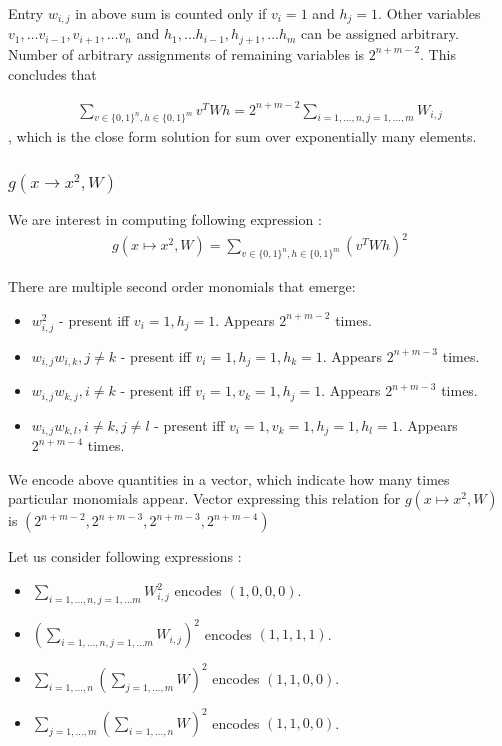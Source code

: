 \documentclass{article}
\begin{document}
Entry $w_{i,j}$ in above sum is counted only if $v_i = 1$ and $h_j = 1$. Other variables
$v_1, \dots v_{i-1}, v_{i+1}, \dots v_n$ and $h_1, \dots h_{i-1}, h_{j+1}, \dots h_m$ can be 
assigned arbitrary. Number of arbitrary assignments of remaining variables is $2^{n + m - 2}$. 
This concludes that 

\begin{gather*}
	\sum_{v \in \{0, 1\}^n, h \in \{0, 1\}^m} v^TWh = 2^{n + m - 2}\sum_{i = 1, \dots, n, j = 1, \dots, m} W_{i, j}
\end{gather*}
, which is the close form solution for sum over exponentially many elements.

\subsubsection{$g(x \rightarrow x^2, W)$}

We are interest in computing following expression : 
\begin{gather*}
	g(x \mapsto x^2, W) = \sum_{v \in \{0, 1\}^n, h \in \{0, 1\}^m} (v^TWh)^2
\end{gather*}

There are multiple second order monomials that emerge: 

\begin{itemize}
	\item $w_{i,j}^2$ - present iff $v_i = 1, h_j = 1$. Appears $2^{n + m - 2}$ times.
	\item $w_{i,j} w_{i, k}, j \neq k$ - present iff $v_i = 1, h_j = 1, h_k = 1$. Appears $2^{n + m - 3}$ times.	
	\item $w_{i,j} w_{k, j}, i \neq k$ - present iff $v_i = 1, v_k = 1, h_j = 1$. Appears $2^{n + m - 3}$ times.
	\item $w_{i,j} w_{k, l}, i \neq k, j \neq l$ - present iff $v_i = 1, v_k = 1, h_j = 1, h_l = 1$. Appears $2^{n + m - 4}$ times.			
\end{itemize}
We encode above quantities in a vector, which indicate how many times particular monomials 
appear. Vector expressing this relation for $g(x \mapsto x^2, W)$ is $(2^{n + m - 2}, 2^{n + m - 3}, 2^{n + m - 3}, 2^{n + m - 4})$


Let us consider following expressions : 
\begin{itemize}
 \item $\sum_{i = 1, \dots, n, j = 1, \dots m} W_{i, j}^2$ encodes $(1, 0, 0, 0)$. 
 \item $(\sum_{i = 1, \dots, n, j = 1, \dots m} W_{i, j})^2$ encodes $(1, 1, 1, 1)$.
 \item $\sum_{i = 1, \dots, n}(\sum_{j = 1, \dots, m} W)^2$ encodes $(1, 1, 0, 0)$. 
 \item $\sum_{j = 1, \dots, m}(\sum_{i = 1, \dots, n} W)^2$ encodes $(1, 1, 0, 0)$. 
\end{itemize}
 
\end{document}
